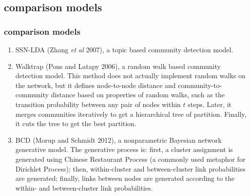 \documentclass{beamer}
\begin{document}
\subsection{comparison models}
\begin{frame}
\frametitle{comparison models}
\begin{enumerate}
	\item SSN-LDA (Zhang \textit{et al} 2007), a topic based community detection model. 
	\item Walktrap (Pons and Latapy 2006), a random walk based community detection model. This method does not actually implement random walks on the network, but it defines node-to-node distance and community-to-community distance based on properties of random walks, such as the transition probability between any pair of nodes within $t$ steps. Later, it merges communities iteratively to get a hierarchical tree of partition. Finally, it cuts the tree to get the best partition.
	\item BCD (Morup and Schmidt 2012), a nonparametric Bayesian network generative model. The generative process is: first, a cluster assignment is generated using Chinese Restaurant Process (a commonly used metaphor for Dirichlet Process); then, within-cluster and between-cluster link probabilities are generated; finally, links between nodes are generated according to the within- and between-cluster link probabilities.
\end{enumerate} 
\end{frame}
\end{document}
